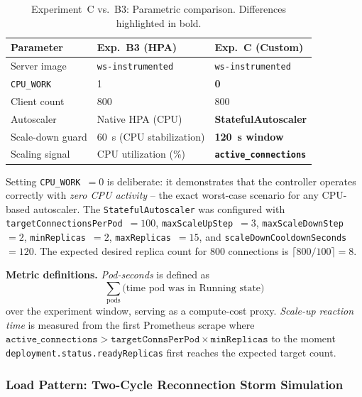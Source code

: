\documentclass[twocolumn]{svjour3}
\begin{document}
\begin{table}[ht]
\centering
\caption{Experiment~C vs.\ B3: Parametric comparison. Differences highlighted in bold.}
\label{tab:exp_c_setup}
\begin{tabular}{@{}lll@{}}
\toprule
\rowcolor{gray!12}
\textbf{Parameter} & \textbf{Exp.~B3 (HPA)} & \textbf{Exp.~C (Custom)} \\
\midrule
Server image & \texttt{ws-instrumented} & \texttt{ws-instrumented} \\
\texttt{CPU\_WORK} & 1 & \textbf{0} \\
Client count & 800 & 800 \\
Autoscaler & Native HPA (CPU) & \textbf{StatefulAutoscaler} \\
Scale-down guard & 60~s (CPU stabilization) & \textbf{120~s window} \\
Scaling signal & CPU utilization (\%) & \textbf{\texttt{active\_connections}} \\
\bottomrule
\end{tabular}
\end{table}

Setting \texttt{CPU\_WORK}~$= 0$ is deliberate: it demonstrates that the controller operates
correctly with \textit{zero CPU activity} -- the exact worst-case scenario for any CPU-based
autoscaler. The \texttt{StatefulAutoscaler} was configured with
\texttt{targetConnectionsPerPod}~$= 100$, \texttt{maxScaleUpStep}~$= 3$,
\texttt{maxScaleDownStep}~$= 2$, \texttt{minReplicas}~$= 2$, \texttt{maxReplicas}~$= 15$, and
\texttt{scaleDownCooldownSeconds}~$= 120$. The expected desired replica count for 800
connections is $\lceil 800/100 \rceil = 8$.

\textbf{Metric definitions.} \textit{Pod-seconds} is defined as
%
\begin{equation*}
\textstyle
\sum_{\text{pods}} \bigl(\text{time pod was in Running state}\bigr)
\end{equation*}
%
\noindent over the experiment window, serving as a compute-cost proxy.
\textit{Scale-up reaction time} is measured from the first Prometheus scrape where
$\texttt{active\_connections} > \texttt{targetConnsPerPod} \times \texttt{minReplicas}$
to the moment \texttt{deployment.status.readyReplicas} first reaches the expected target
count.

\subsubsection{Load Pattern: Two-Cycle Reconnection Storm Simulation}
\end{document}
